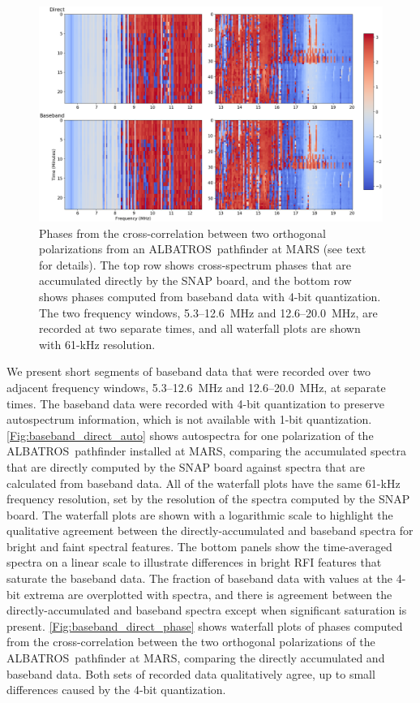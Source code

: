 \documentclass{ws-jai}
\def\albatros{ALBATROS}
\begin{document}
\begin{figure}[t]
  \begin{center}
    \includegraphics[width=\linewidth]{Figures/baseband_direct_phase_compare.png}
    \caption{Phases from the cross-correlation between two orthogonal
      polarizations from an \albatros\ pathfinder at MARS (see text
      for details).  The top row shows cross-spectrum phases that are
      accumulated directly by the SNAP board, and the bottom row shows
      phases computed from baseband data with 4-bit quantization.  The
      two frequency windows, 5.3--12.6~MHz and 12.6--20.0~MHz, are
      recorded at two separate times, and all waterfall plots are
      shown with 61-kHz resolution.}
    \label{Fig:baseband_direct_phase}
  \end{center}
\end{figure}

We present short segments of baseband data that were recorded over two
adjacent frequency windows, 5.3--12.6~MHz and 12.6--20.0~MHz, at
separate times.  The baseband data were recorded with 4-bit
quantization to preserve autospectrum information, which is not
available with 1-bit quantization.  \autoref{Fig:baseband_direct_auto}
shows autospectra for one polarization of the \albatros\ pathfinder
installed at MARS, comparing the accumulated spectra that are directly
computed by the SNAP board against spectra that are calculated from
baseband data.  All of the waterfall plots have the same 61-kHz
frequency resolution, set by the resolution of the spectra computed by
the SNAP board.  The waterfall plots are shown with a logarithmic
scale to highlight the qualitative agreement between the
directly-accumulated and baseband spectra for bright and faint
spectral features.  The bottom panels show the time-averaged spectra
on a linear scale to illustrate differences in bright RFI features
that saturate the baseband data.  The fraction of baseband data with
values at the 4-bit extrema are overplotted with spectra, and there is
agreement between the directly-accumulated and baseband spectra except
when significant saturation is present.
\autoref{Fig:baseband_direct_phase} shows waterfall plots of phases
computed from the cross-correlation between the two orthogonal
polarizations of the \albatros\ pathfinder at MARS, comparing the
directly accumulated and baseband data.  Both sets of recorded data
qualitatively agree, up to small differences caused by the 4-bit
quantization.
\end{document}
